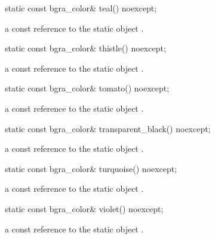 \begin{itemdecl}
static const bgra_color& teal() noexcept;
\end{itemdecl}
\begin{itemdescr}
\pnum
\returns
a const reference to the static  object .
\end{itemdescr}

\begin{itemdecl}
static const bgra_color& thistle() noexcept;
\end{itemdecl}
\begin{itemdescr}
\pnum
\returns
a const reference to the static  object .
\end{itemdescr}

\begin{itemdecl}
static const bgra_color& tomato() noexcept;
\end{itemdecl}
\begin{itemdescr}
\pnum
\returns
a const reference to the static  object .
\end{itemdescr}

\begin{itemdecl}
static const bgra_color& transparent_black() noexcept;
\end{itemdecl}
\begin{itemdescr}
\pnum
\returns
a const reference to the static  object .
\end{itemdescr}

\begin{itemdecl}
static const bgra_color& turquoise() noexcept;
\end{itemdecl}
\begin{itemdescr}
\pnum
\returns
a const reference to the static  object .
\end{itemdescr}

\begin{itemdecl}
static const bgra_color& violet() noexcept;
\end{itemdecl}
\begin{itemdescr}
\pnum
\returns
a const reference to the static  object .
\end{itemdescr}


